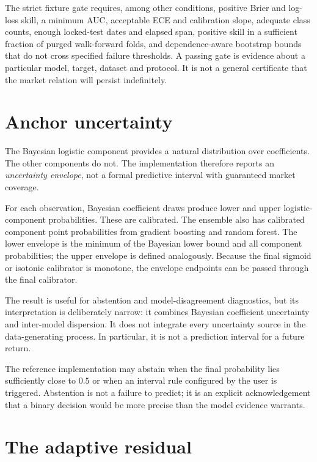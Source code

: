 \documentclass[11pt]{article}
\begin{document}
The strict fixture gate requires, among other conditions, positive Brier and log-loss skill, a minimum AUC, acceptable ECE and calibration slope, adequate class counts, enough locked-test dates and elapsed span, positive skill in a sufficient fraction of purged walk-forward folds, and dependence-aware bootstrap bounds that do not cross specified failure thresholds. A passing gate is evidence about a particular model, target, dataset and protocol. It is not a general certificate that the market relation will persist indefinitely.

\section{Anchor uncertainty}
\label{sec:anchoruncertainty}

The Bayesian logistic component provides a natural distribution over coefficients. The other components do not. The implementation therefore reports an \emph{uncertainty envelope}, not a formal predictive interval with guaranteed market coverage.

For each observation, Bayesian coefficient draws produce lower and upper logistic-component probabilities. These are calibrated. The ensemble also has calibrated component point probabilities from gradient boosting and random forest. The lower envelope is the minimum of the Bayesian lower bound and all component probabilities; the upper envelope is defined analogously. Because the final sigmoid or isotonic calibrator is monotone, the envelope endpoints can be passed through the final calibrator.

The result is useful for abstention and model-disagreement diagnostics, but its interpretation is deliberately narrow: it combines Bayesian coefficient uncertainty and inter-model dispersion. It does not integrate every uncertainty source in the data-generating process. In particular, it is not a prediction interval for a future return.

The reference implementation may abstain when the final probability lies sufficiently close to $0.5$ or when an interval rule configured by the user is triggered. Abstention is not a failure to predict; it is an explicit acknowledgement that a binary decision would be more precise than the model evidence warrants.

\section{The adaptive residual}
\label{sec:adaptive}
\end{document}
